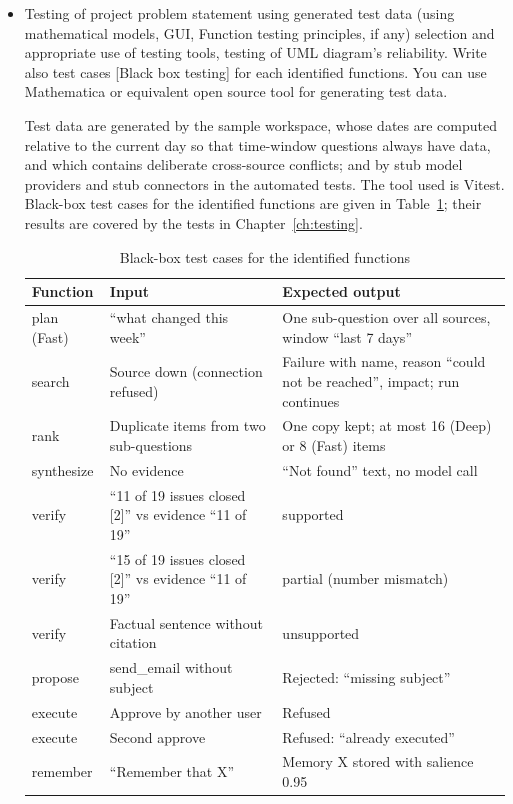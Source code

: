 \documentclass[oneside,a4paper,12pt]{report}
\begin{document}
\begin{appendices}
\begin{itemize}
\item Testing of project problem statement using generated test data (using mathematical models, GUI, Function testing principles, if any) selection and appropriate use of testing tools, testing of UML diagram's reliability. Write also test cases [Black box testing] for each identified functions.
You can use Mathematica or equivalent open source tool for generating test data.

Test data are generated by the sample workspace, whose dates are computed relative to the current day so that time-window questions always have data, and which contains deliberate cross-source conflicts; and by stub model providers and stub connectors in the automated tests. The tool used is Vitest. Black-box test cases for the identified functions are given in Table~\ref{tab:blackbox}; their results are covered by the tests in Chapter~\ref{ch:testing}.

\begin{table}[!htbp]
\begin{center}
\def\arraystretch{1.25}
\small
\begin{tabularx}{\textwidth}{| p{2.3cm} | X | X |}
\hline
Function & Input & Expected output \\ \hline
plan (Fast) & ``what changed this week'' & One sub-question over all sources, window ``last 7 days'' \\ \hline
search & Source down (connection refused) & Failure with name, reason ``could not be reached'', impact; run continues \\ \hline
rank & Duplicate items from two sub-questions & One copy kept; at most 16 (Deep) or 8 (Fast) items \\ \hline
synthesize & No evidence & ``Not found'' text, no model call \\ \hline
verify & ``11 of 19 issues closed [2]'' vs evidence ``11 of 19'' & supported \\ \hline
verify & ``15 of 19 issues closed [2]'' vs evidence ``11 of 19'' & partial (number mismatch) \\ \hline
verify & Factual sentence without citation & unsupported \\ \hline
propose & send\_email without subject & Rejected: ``missing subject'' \\ \hline
execute & Approve by another user & Refused \\ \hline
execute & Second approve & Refused: ``already executed'' \\ \hline
remember & ``Remember that X'' & Memory X stored with salience 0.95 \\ \hline
\end{tabularx}
\end{center}
\caption{Black-box test cases for the identified functions}
\label{tab:blackbox}
\end{table}


\end{itemize}
\end{appendices}
\end{document}

